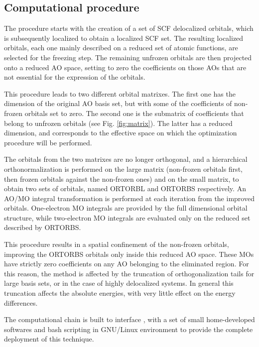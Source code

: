 \subsection*{Computational procedure}

The procedure starts with the creation of a set of SCF delocalized orbitals,
which is subsequently localized to obtain a localized SCF set. The resulting
localized orbitals, each one mainly described on a reduced set of atomic functions, are
selected for the freezing step. The remaining unfrozen orbitals are then
projected onto a reduced AO space, setting to zero the coefficients on
those AOs that are not essential for the expression of the orbitals.



This procedure leads to two different orbital matrixes. The first one
has the dimension of the original AO basis set, but with some of
the coefficients of non-frozen orbitals set to zero. The second one is
the submatrix of coefficients that belong to unfrozen orbitals
(see Fig. \ref{fig:matrix}).  The latter has a reduced dimension, and
corresponds to the effective space on which the optimization procedure will
be performed.

The orbitals from the two matrixes are no longer orthogonal, and a
hierarchical orthonormalization is performed on the large matrix (non-frozen
orbitals first, then frozen orbitals against the non-frozen ones) and on the
small matrix, to obtain two sets of orbitals, named ORTORBL and ORTORBS
respectively.  An AO/MO integral transformation is performed at each
iteration from the improved orbitals. One-electron MO integrals are provided
by the full dimensional orbital structure, while two-electron MO integrals
are evaluated only on the reduced set described by ORTORBS. 

This procedure results in a spatial confinement of the non-frozen orbitals,
improving the ORTORBS orbitals only inside this reduced AO space. These MOs
have strictly zero coefficients on any AO belonging to the eliminated
region.  For this reason, the method is affected by the truncation of
orthogonalization tails for large basis sets, or in the case of highly
delocalized systems. In general this truncation affects the absolute
energies, with very little effect on the energy differences.

The computational chain is built to interface  \cite{molcas-site}, with
a set of small home-developed softwares and bash scripting in GNU/Linux
\cite{gnu-linux-site} environment to provide the complete deployment of this
technique.

